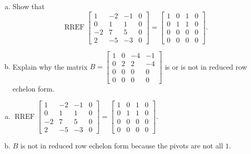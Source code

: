 
\begin{exerciseStatement}

\begin{enumerate}[(a)]
\item Show that \[\operatorname{RREF} \left[\begin{array}{cccc}
1 & -2 & -1 & 0 \\
0 & 1 & 1 & 0 \\
-2 & 7 & 5 & 0 \\
2 & -5 & -3 & 0
\end{array}\right] = \left[\begin{array}{cccc}
1 & 0 & 1 & 0 \\
0 & 1 & 1 & 0 \\
0 & 0 & 0 & 0 \\
0 & 0 & 0 & 0
\end{array}\right] .\]
\item Explain why the matrix \(B= \left[\begin{array}{cccc}
1 & 0 & -4 & -1 \\
0 & 2 & 2 & -4 \\
0 & 0 & 0 & 0 \\
0 & 0 & 0 & 0
\end{array}\right] \) is or is not in reduced row echelon form.
\end{enumerate}
    
\end{exerciseStatement}
    
\begin{exerciseAnswer} 

\begin{enumerate}[(a)]
\item \(\operatorname{RREF} \left[\begin{array}{cccc}
1 & -2 & -1 & 0 \\
0 & 1 & 1 & 0 \\
-2 & 7 & 5 & 0 \\
2 & -5 & -3 & 0
\end{array}\right] = \left[\begin{array}{cccc}
1 & 0 & 1 & 0 \\
0 & 1 & 1 & 0 \\
0 & 0 & 0 & 0 \\
0 & 0 & 0 & 0
\end{array}\right] .\)
\item \(B\) is not in reduced row echelon form because the pivots are not all \(1\). 
\end{enumerate}
    
\end{exerciseAnswer}
    
